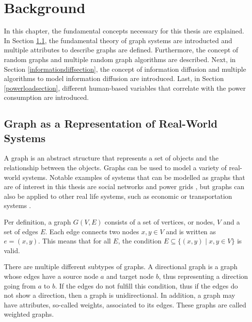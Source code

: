 \chapter{Background}
\label{background}

In this chapter, the fundamental concepts necessary for this thesis are explained.
In Section \ref{graphbasics}, the fundamental theory of graph systems are 
introducted and multiple attributes to describe graphs are defined.
Furthermore, the concept of random graphs and multiple random 
graph algorithms are described.
Next, in Section \ref{informationdiffsection}, the concept of information diffusion
and multiple algorithms to model information diffusion are introduced.
Last, in Section \ref{powerloadsection}, different human-based variables that 
correlate with the power consumption are introduced.


\section{Graph as a Representation of Real-World Systems}
\label{graphbasics}
A graph is an abstract structure that represents a set of objects and the relationship 
between the objects. Graphs can be used to model a variety of real-world systems.
Notable examples of systems that can be modelled as graphs that are of 
interest in this thesis are social networks 
\cite{socialgraphexample} and power grids \cite{powergraphexample}, but graphs can 
also be applied to other real life systems, such as economic 
or transportation systems \cite{economicsgraph}. %


Per definition, a graph $G(V, E)$ consists of a set of vertices, or nodes, $V$ and a 
set of edges $E$. Each edge connects two nodes $x, y \in V$ and is 
written as $e=(x, y)$. This means that for all $E$, the 
condition  $E \subseteq\{ (x, y) \mid x, y \in V  \}$ 
is valid.

There are multiple different subtypes of graphs. A directional graph is a graph 
whose edges have a source node $a$ and target node $b$, thus representing
a direction going from $a$ to $b$. If the edges do not fulfill this 
condition, thus if the edges do not show a direction, then a graph is unidirectional.
In addition, a graph may have attributes, so-called weights, associated to its edges.
These graphs are called weighted graphs.

